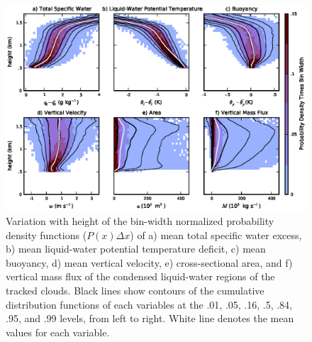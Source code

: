 \documentclass[acp]{copernicus}
\begin{document}
\begin{figure}[t]
\vspace*{2mm}
\begin{center}
\includegraphics[width=\textwidth]{./figures/mean_profiles}
\end{center}
\caption{Variation with height of the bin-width normalized probability 
density functions ($P(x) \Delta x$) of a) mean total specific water excess, 
b) mean liquid-water potential temperature deficit, c) mean buoyancy, d) mean 
vertical velocity, e) cross-sectional area, and f) vertical mass flux of the 
condensed liquid-water regions of the tracked clouds.  Black lines show 
contours of the cumulative distribution functions of each variables at the .01, 
.05, .16, .5, .84, .95, and .99 levels, from left to right.  White line denotes 
the mean values for each variable. }
\label{fig:mean_profiles}
\end{figure}
\end{document}

